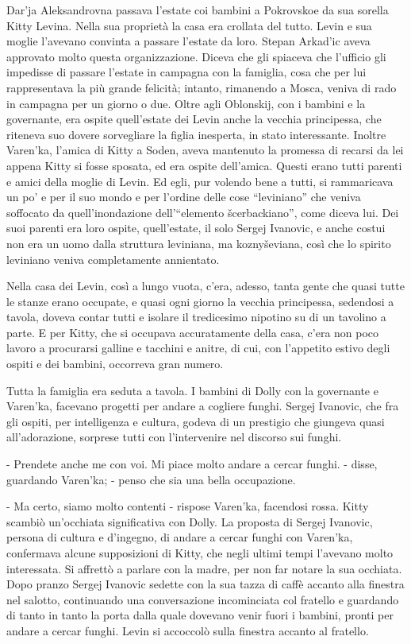 \label{parte-sesta} 
\pagestyle{pagina}

Dar'ja Aleksandrovna passava l'estate coi bambini a Pokrovskoe da sua sorella Kitty Levina. Nella sua proprietà la casa era crollata del tutto. Levin e sua moglie l'avevano convinta a passare l'estate da loro. Stepan Arkad'ic aveva approvato molto questa organizzazione. Diceva che gli spiaceva che l'ufficio gli impedisse di passare l'estate in campagna con la famiglia, cosa che per lui rappresentava la più grande felicità; intanto, rimanendo a Mosca, veniva di rado in campagna per un giorno o due. Oltre agli Oblonskij, con i bambini e la governante, era ospite quell'estate dei Levin anche la vecchia principessa, che riteneva suo dovere sorvegliare la figlia inesperta, in stato interessante. Inoltre Varen'ka, l'amica di Kitty a Soden, aveva mantenuto la promessa di recarsi da lei appena Kitty si fosse sposata, ed era ospite dell'amica. Questi erano tutti parenti e amici della moglie di Levin. Ed egli, pur volendo bene a tutti, si rammaricava un po' e per il suo mondo e per l'ordine delle cose ``leviniano'' che veniva soffocato da quell'inondazione dell'``elemento šcerbackiano'', come diceva lui. Dei suoi parenti era loro ospite, quell'estate, il solo Sergej Ivanovic, e anche costui non era un uomo dalla struttura leviniana, ma koznyševiana, così che lo spirito leviniano veniva completamente annientato. 

Nella casa dei Levin, così a lungo vuota, c'era, adesso, tanta gente che quasi tutte le stanze erano occupate, e quasi ogni giorno la vecchia principessa, sedendosi a tavola, doveva contar tutti e isolare il tredicesimo nipotino su di un tavolino a parte. E per Kitty, che si occupava accuratamente della casa, c'era non poco lavoro a procurarsi galline e tacchini e anitre, di cui, con l'appetito estivo degli ospiti e dei bambini, occorreva gran numero. 

Tutta la famiglia era seduta a tavola. I bambini di Dolly con la governante e Varen'ka, facevano progetti per andare a cogliere funghi. Sergej Ivanovic, che fra gli ospiti, per intelligenza e cultura, godeva di un prestigio che giungeva quasi all'adorazione, sorprese tutti con l'intervenire nel discorso sui funghi. 

- Prendete anche me con voi. Mi piace molto andare a cercar funghi. - disse, guardando Varen'ka; - penso che sia una bella occupazione. 

- Ma certo, siamo molto contenti - rispose Varen'ka, facendosi rossa. Kitty scambiò un'occhiata significativa con Dolly. La proposta di Sergej Ivanovic, persona di cultura e d'ingegno, di andare a cercar funghi con Varen'ka, confermava alcune supposizioni di Kitty, che negli ultimi tempi l'avevano molto interessata. Si affrettò a parlare con la madre, per non far notare la sua occhiata. Dopo pranzo Sergej Ivanovic sedette con la sua tazza di caffè accanto alla finestra nel salotto, continuando una conversazione incominciata col fratello e guardando di tanto in tanto la porta dalla quale dovevano venir fuori i bambini, pronti per andare a cercar funghi. Levin si accoccolò sulla finestra accanto al fratello. 

